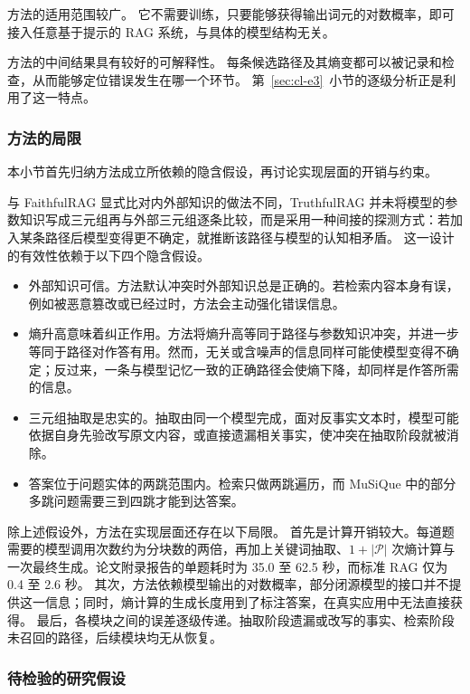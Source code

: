 方法的适用范围较广。
它不需要训练，只要能够获得输出词元的对数概率，即可接入任意基于提示的 RAG 系统，与具体的模型结构无关。

方法的中间结果具有较好的可解释性。
每条候选路径及其熵变都可以被记录和检查，从而能够定位错误发生在哪一个环节。
第~\ref{sec:cl-e3}~小节的逐级分析正是利用了这一特点。

\subsubsection{方法的局限}
\label{sec:cl-cons}

本小节首先归纳方法成立所依赖的隐含假设，再讨论实现层面的开销与约束。

与 FaithfulRAG 显式比对内外部知识的做法不同，TruthfulRAG 并未将模型的参数知识写成三元组再与外部三元组逐条比较，而是采用一种间接的探测方式：若加入某条路径后模型变得更不确定，就推断该路径与模型的认知相矛盾。
这一设计的有效性依赖于以下四个隐含假设。
\begin{itemize}
  \item[A1] 外部知识可信。方法默认冲突时外部知识总是正确的。若检索内容本身有误，例如被恶意篡改或已经过时，方法会主动强化错误信息。
  \item[A2] 熵升高意味着纠正作用。方法将熵升高等同于路径与参数知识冲突，并进一步等同于路径对作答有用。然而，无关或含噪声的信息同样可能使模型变得不确定；反过来，一条与模型记忆一致的正确路径会使熵下降，却同样是作答所需的信息。
  \item[A3] 三元组抽取是忠实的。抽取由同一个模型完成，面对反事实文本时，模型可能依据自身先验改写原文内容，或直接遗漏相关事实，使冲突在抽取阶段就被消除。
  \item[A4] 答案位于问题实体的两跳范围内。检索只做两跳遍历，而 MuSiQue 中的部分多跳问题需要三到四跳才能到达答案。
\end{itemize}

除上述假设外，方法在实现层面还存在以下局限。
首先是计算开销较大。每道题需要的模型调用次数约为分块数的两倍，再加上关键词抽取、$1+|\mathcal{P}|$ 次熵计算与一次最终生成。论文附录报告的单题耗时为 35.0 至 62.5 秒，而标准 RAG 仅为 0.4 至 2.6 秒。
其次，方法依赖模型输出的对数概率，部分闭源模型的接口并不提供这一信息；同时，熵计算的生成长度用到了标注答案，在真实应用中无法直接获得。
最后，各模块之间的误差逐级传递。抽取阶段遗漏或改写的事实、检索阶段未召回的路径，后续模块均无从恢复。

\subsubsection{待检验的研究假设}
\label{sec:cl-hypo}

